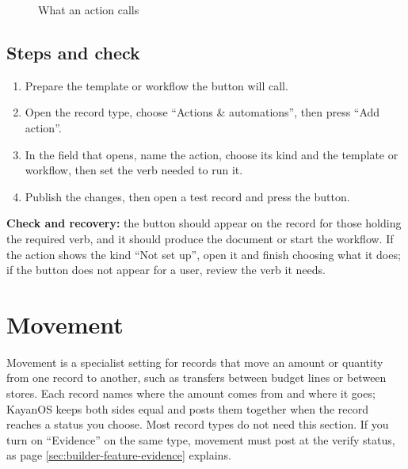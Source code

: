\begin{figure}[H]
\centering
{}
\rclegend
\caption{What an action calls}
\label{fig:builder-actions-model}
\end{figure}

\subsection{Steps and check}
\begin{enumerate}
\item Prepare the template or workflow the button will call.
\item Open the record type, choose “Actions \& automations”, then press “Add action”.
\item In the field that opens, name the action, choose its kind and the template or workflow, then set the verb needed to run it.
\item Publish the changes, then open a test record and press the button.
\end{enumerate}

\textbf{Check and recovery:} the button should appear on the record for those holding the required verb, and it should produce the document or start the workflow. If the action shows the kind “Not set up”, open it and finish choosing what it does; if the button does not appear for a user, review the verb it needs.

\clearpage
\section{Movement}
\label{sec:builder-feature-movement}

Movement is a specialist setting for records that move an amount or quantity from one record to another, such as transfers between budget lines or between stores. Each record names where the amount comes from and where it goes; KayanOS keeps both sides equal and posts them together when the record reaches a status you choose. Most record types do not need this section. If you turn on “Evidence” on the same type, movement must post at the verify status, as page \ref{sec:builder-feature-evidence} explains.


